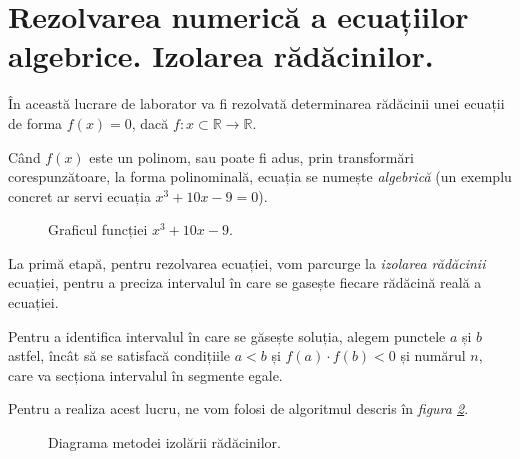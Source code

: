 \section{Rezolvarea numerică a ecuațiilor algebrice. Izolarea rădăcinilor.}

În această lucrare de laborator va fi rezolvată determinarea rădăcinii unei ecuații de 
forma $f(x)=0$, dacă $f: x\subset \mathbb{R} \rightarrow \mathbb{R}$. \par
Când $f(x)$ este un polinom, sau poate fi adus, prin transformări corespunzătoare, la 
forma polinominală, ecuația se numește \textit{algebrică} (un exemplu concret ar servi 
ecuația $x^3+10x-9=0$). \par

\begin{figure}[H]
    \centering
    
    \caption{Graficul funcției $x^3 + 10x - 9$.}
    \label{fig:grafic}
\end{figure}

La primă etapă, pentru rezolvarea ecuației, vom parcurge la \textit{izolarea 
rădăcinii} ecuației, pentru a preciza intervalul în care se gasește fiecare rădăcină 
reală a ecuației. \par

Pentru a identifica intervalul în care se găsește soluția, alegem punctele $a$ și $b$ astfel, 
încât să se satisfacă condițiile $a<b$ și $f(a) \cdot f(b) < 0$ și numărul $n$, care va secționa 
intervalul în segmente egale. \par

Pentru a realiza acest lucru, ne vom folosi de algoritmul descris în \textit{figura \ref{fig:root-isolation-flowchart}}.

\begin{figure}[H]
    \centering
    
    \caption{Diagrama metodei izolării rădăcinilor.}
    \label{fig:root-isolation-flowchart}
\end{figure}

\clearpage
